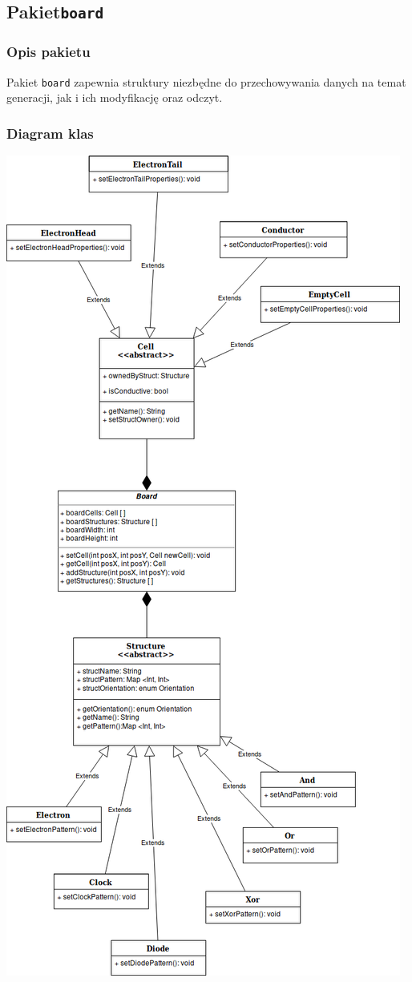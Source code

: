 \documentclass[a4paper,11pt]{article}
\begin{document}
        \subsection{Pakiet\texttt{board}}
            \subsubsection{Opis pakietu}
            Pakiet \texttt{board} zapewnia struktury niezbędne do przechowywania danych na temat generacji, jak i ich modyfikację oraz odczyt.
            \subsubsection{Diagram klas}
            \begin{center}
 \includegraphics[scale=0.35]{images/pakiet_board.png}

\end{center}
\end{document}
